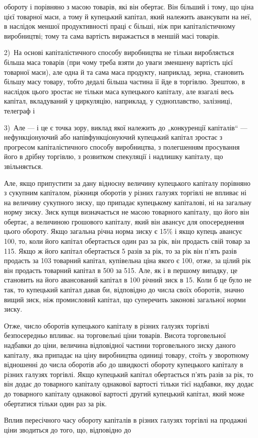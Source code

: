 \parcont{}  %
обороту і порівняно з масою товарів, які він обертає. Він більший і
тому, що ціна цієї товарної маси, а тому й купецький капітал,
який належить авансувати на неї, в наслідок меншої продуктивності
праці є більші, ніж при капіталістичному виробництві;
тому та сама вартість виражається в меншій масі товарів.

2)~На основі капіталістичного способу виробництва не тільки
виробляється більша маса товарів (при чому треба взяти до
уваги зменшену вартість цієї товарної маси), але одна й та сама
маса продукту, наприклад, зерна, становить більшу масу товару,
тобто дедалі більша частина її йде в торгівлю. Зрештою, в наслідок
цього зростає не тільки маса купецького капіталу, але
взагалі весь капітал, вкладуваний у циркуляцію, наприклад, у
судноплавство, залізниці, телеграф і~

3)~Але — і це є точка зору, виклад якої належить до „конкуренції
капіталів“ — нефункціонуючий або напівфункціонуючий
купецький капітал зростає з прогресом капіталістичного способу
виробництва, з полегшенням просування його в дрібну торгівлю,
з розвитком спекуляції і надлишку капіталу, що звільняється.

Але, якщо припустити за дану відносну величину купецького
капіталу порівняно з сукупним капіталом, ріжниця оборотів
у різних галузях торгівлі не впливає ні на величину сукупного
зиску, що припадає купецькому капіталові, ні на загальну норму
зиску. Зиск купця визначається не масою товарного капіталу,
що його він обертає, а величиною грошового капіталу, який він
авансує для опосереднення цього обороту. Якщо загальна річна
норма зиску є 15\% і якщо купець авансує 100,
то, коли його капітал обертається один раз за рік, він продасть
свій товар за 115. Якщо ж його капітал обертається 5 разів за
рік, то за рік він п’ять разів продасть за 103 товарний капітал,
купівельна ціна якого є 100, отже, за цілий рік він продасть
товарний капітал в 500 за 515. Але, як і в першому випадку, це
становить на його авансований капітал в 100 річний зиск в 15.
Коли б це було не так, то купецький капітал давав би, відповідно
до числа своїх оборотів, значно вищий зиск, ніж промисловий
капітал, що суперечить законові загальної норми зиску.

Отже, число оборотів купецького капіталу в різних галузях
торгівлі безпосередньо впливає. на торговельні ціни товарів. Висота
торговельної надбавки до ціни, величина відповідної частини
торговельного зиску даного капіталу, яка припадає на ціну
виробництва одиниці товару, стоїть у зворотному відношенні
до числа оборотів або до швидкості обороту купецького
капіталу в різних галузях торгівлі. Якщо купецький капітал
обертається п’ять разів за рік, то він додає до товарного капіталу
однакової вартості тільки  тієї надбавки, яку додає до товарного
капіталу однакової вартості другий купецький капітал, який може
обертатися тільки один раз за рік.

Вплив пересічного часу обороту капіталів в різних галузях
торгівлі на продажні ціни зводиться до того, що, відповідно до
\parbreak{}  %

